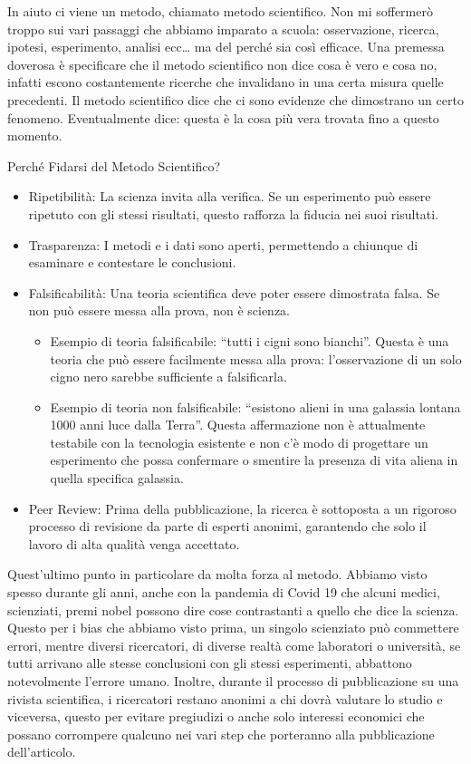 \documentclass[12pt]{book} %
\begin{document}
In aiuto ci viene un metodo, chiamato metodo scientifico. Non mi soffermerò troppo sui vari passaggi che abbiamo
imparato a scuola: osservazione, ricerca, ipotesi, esperimento, analisi ecc… ma del perché sia così efficace. Una
premessa doverosa è specificare che il metodo scientifico non dice cosa è vero e cosa no, infatti escono costantemente
ricerche che invalidano in una certa misura quelle precedenti. Il metodo scientifico dice che ci sono evidenze che
dimostrano un certo fenomeno. Eventualmente dice: questa è la cosa più vera trovata fino a questo momento.

Perché Fidarsi del Metodo Scientifico? 

\begin{itemize}
\item Ripetibilità: La scienza invita alla verifica. Se un esperimento può essere ripetuto con gli stessi risultati,
questo rafforza la fiducia nei suoi risultati.
\item Trasparenza: I metodi e i dati sono aperti, permettendo a chiunque di esaminare e contestare le conclusioni.
\item Falsificabilità: Una teoria scientifica deve poter essere dimostrata falsa. Se non può essere messa alla prova,
non è scienza. 

\begin{itemize}
\item Esempio di teoria falsificabile: “tutti i cigni sono bianchi”. Questa è una teoria che può essere facilmente messa
alla prova: l'osservazione di un solo cigno nero sarebbe sufficiente a falsificarla.
\item Esempio di teoria non falsificabile: “esistono alieni in una galassia lontana 1000 anni luce dalla Terra”. Questa
affermazione non è attualmente testabile con la tecnologia esistente e non c'è modo di progettare
un esperimento che possa confermare o smentire la presenza di vita aliena in quella specifica galassia.
\end{itemize}
\item Peer Review: Prima della pubblicazione, la ricerca è sottoposta a un rigoroso processo di revisione da parte di
esperti anonimi, garantendo che solo il lavoro di alta qualità venga accettato.
\end{itemize}
Quest'ultimo punto in particolare da molta forza al metodo. Abbiamo visto spesso durante gli anni,
anche con la pandemia di Covid 19 che alcuni medici, scienziati, premi nobel possono dire cose contrastanti a quello
che dice la scienza. Questo per i bias che abbiamo visto prima, un singolo scienziato può commettere errori, mentre
diversi ricercatori, di diverse realtà come laboratori o università, se tutti arrivano alle stesse conclusioni con gli
stessi esperimenti, abbattono notevolmente l'errore umano. Inoltre, durante il processo di
pubblicazione su una rivista scientifica, i ricercatori restano anonimi a chi dovrà valutare lo studio e viceversa,
questo per evitare pregiudizi o anche solo interessi economici che possano corrompere qualcuno nei vari step che
porteranno alla pubblicazione dell'articolo.
\end{document}
